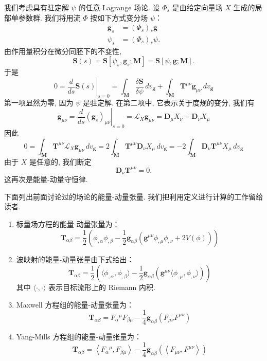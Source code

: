 我们考虑具有驻定解 $\psi$ 的任意 Lagrange 场论. 设 $\Phi_s$ 是由给定向量场 $X$ 生成的局部单参数群. 我们将用流 $\Phi$ 按如下方式变分场 $\psi$：
\[
\begin{aligned}
\mathbf{g}_s &= (\Phi_s)_*\mathbf{g}\\
\psi_s &= (\Phi_s)_*\psi.
\end{aligned}
\]
由作用量积分在微分同胚下的不变性, 
\[
\mathbf{S}(s) = \mathbf{S}[\psi_s, \mathbf{g}_s;\mathbf{M}] = \mathbf{S}[\psi, \mathbf{g};\mathbf{M}].
\]
于是
\begin{equation}
0 = \left.\frac{d}{ds}\mathbf{S}(s)\right|_{s=0} = \int_{\mathbf{M}}\frac{\delta\mathbf{S}}{\delta\psi}\, dv_{\mathbf{g}} + \int_{\mathbf{M}}\mathbf{T}^{\mu\nu}\dot{\mathbf{g}}_{\mu\nu}\, dv_{\mathbf{g}}\label{eq:c1-63}
\end{equation}
第一项显然为零, 因为 $\psi$ 是驻定解. 在第二项中, 它表示关于度规的变分, 我们有
\[
\dot{\mathbf{g}}_{\mu\nu} = \left.\frac{d}{ds}(\mathbf{g}_s)_{\mu\nu}\right|_{s=0} = \mathcal{L}_X\mathbf{g}_{\mu\nu} = \mathbf{D}_\mu X_\nu + \mathbf{D}_\nu X_\mu
\]
因此
\[
0 = \int_{\mathbf{M}}\mathbf{T}^{\mu\nu}\mathcal{L}_X\mathbf{g}_{\mu\nu}\, dv_{\mathbf{g}} = 2\int_{\mathbf{M}}\mathbf{T}^{\mu\nu}\mathbf{D}_\nu X_\mu\, dv_{\mathbf{g}} = -2\int_{\mathbf{M}}\mathbf{D}_\nu\mathbf{T}^{\mu\nu}X_\mu\, dv_{\mathbf{g}}
\]
由于 $X$ 是任意的, 我们断定
\begin{equation}
\mathbf{D}_\nu\mathbf{T}^{\mu\nu} = 0.\label{eq:c1-64}
\end{equation}
这再次是能量-动量守恒律. 

下面列出前面讨论过的场论的能量-动量张量. 我们把利用定义进行计算的工作留给读者. 

\begin{enumerate}
\item 标量场方程的能量-动量张量为：
\[
\mathbf{T}_{\alpha\beta} = \frac{1}{2}\left(\phi_{, \alpha}\phi_{, \beta} - \frac{1}{2}\mathbf{g}_{\alpha\beta}\left(\mathbf{g}^{\mu\nu}\phi_{, \mu}\phi_{, \nu} + 2V(\phi)\right)\right)
\]
\item 波映射的能量-动量张量由下式给出：
\[
\mathbf{T}_{\alpha\beta} = \frac{1}{2}\left(\langle\phi_{, \alpha}, \phi_{, \beta}\rangle - \frac{1}{2}\mathbf{g}_{\alpha\beta}\left(\mathbf{g}^{\mu\nu}\langle\phi_{, \mu}, \phi_{, \nu}\rangle\right)\right)
\]
其中 $\langle\cdot, \cdot\rangle$ 表示目标流形上的 Riemann 内积. 
\item Maxwell 方程组的能量-动量张量为：
\[
\mathbf{T}_{\alpha\beta} = F_\alpha{}^\mu F_{\beta\mu} - \frac{1}{4}\mathbf{g}_{\alpha\beta}\left(F_{\mu\nu}F^{\mu\nu}\right)
\]
\item Yang-Mills 方程组的能量-动量张量为：
\[
\mathbf{T}_{\alpha\beta} = \left\langle F_\alpha{}^\mu, F_{\beta\mu}\right\rangle - \frac{1}{4}\mathbf{g}_{\alpha\beta}\left(\left\langle F_{\mu\nu}, F^{\mu\nu}\right\rangle\right)
\]
\end{enumerate}

